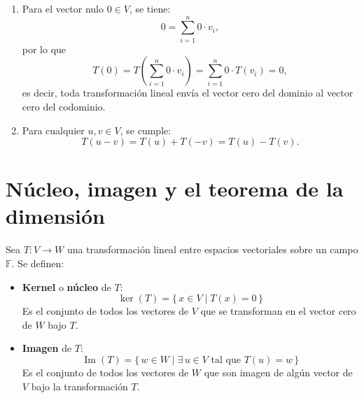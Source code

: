 \begin{example}
\begin{enumerate}
    \item Para el vector nulo $0 \in V$, se tiene:
    \[
    0 = \sum_{i=1}^n 0 \cdot v_i,
    \]
    por lo que
    \[
    T(0) = T\left(\sum_{i=1}^n 0 \cdot v_i\right) = \sum_{i=1}^n 0 \cdot T(v_i) = 0,
    \]
    es decir, toda transformación lineal envía el vector cero del dominio al vector cero del codominio.

    \item Para cualquier $u, v \in V$, se cumple:
    \[
    T(u - v) = T(u) + T(-v) = T(u) - T(v).
    \]
\end{enumerate}
\end{example}

\section{Núcleo, imagen y el teorema de la dimensión}

\begin{definition}
Sea $T: V \to W$ una transformación lineal entre espacios vectoriales sobre un campo $\mathbb{F}$. Se definen:

\begin{itemize}
    \item \textbf{Kernel} o \textbf{núcleo} de $T$:
    \[
    \ker(T) = \{\, x \in V \mid T(x) = 0 \,\}
    \]
    Es el conjunto de todos los vectores de $V$ que se transforman en el vector cero de $W$ bajo $T$.

    \item \textbf{Imagen} de $T$:
    \[
    \operatorname{Im}(T) = \{\, w \in W \mid \exists\, u \in V \text{ tal que } T(u) = w \,\}
    \]
    Es el conjunto de todos los vectores de $W$ que son imagen de algún vector de $V$ bajo la transformación $T$.
\end{itemize}
\end{definition}


